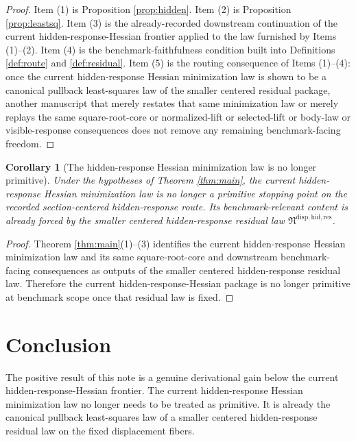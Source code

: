 \documentclass[11pt]{article}
\newcommand{\ResidualLawPackage}{\mathfrak N^{\mathrm{disp,hid,res}}}
\newtheorem{corollary}{Corollary}
\begin{document}
\begin{proof}
Item (1) is Proposition \ref{prop:hidden}. Item (2) is Proposition \ref{prop:leastsq}. Item (3) is the already-recorded downstream continuation of the current hidden-response-Hessian frontier applied to the law furnished by Items (1)--(2). Item (4) is the benchmark-faithfulness condition built into Definitions \ref{def:route} and \ref{def:residual}. Item (5) is the routing consequence of Items (1)--(4): once the current hidden-response Hessian minimization law is shown to be a canonical pullback least-squares law of the smaller centered residual package, another manuscript that merely restates that same minimization law or merely replays the same square-root-core or normalized-lift or selected-lift or body-law or visible-response consequences does not remove any remaining benchmark-facing freedom.
\end{proof}

\begin{corollary}[The hidden-response Hessian minimization law is no longer primitive]
\label{cor:nonprimitive}
Under the hypotheses of Theorem \ref{thm:main}, the current hidden-response Hessian minimization law is no longer a primitive stopping point on the recorded section-centered hidden-response route. Its benchmark-relevant content is already forced by the smaller centered hidden-response residual law \(\ResidualLawPackage\).
\end{corollary}

\begin{proof}
Theorem \ref{thm:main}(1)--(3) identifies the current hidden-response Hessian minimization law and its same square-root-core and downstream benchmark-facing consequences as outputs of the smaller centered hidden-response residual law. Therefore the current hidden-response-Hessian package is no longer primitive at benchmark scope once that residual law is fixed.
\end{proof}

\section{Conclusion}

The positive result of this note is a genuine derivational gain below the current hidden-response-Hessian frontier. The current hidden-response Hessian minimization law no longer needs to be treated as primitive. It is already the canonical pullback least-squares law of a smaller centered hidden-response residual law on the fixed displacement fibers.
\end{document}
